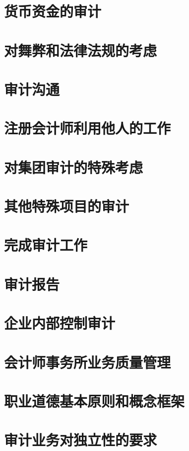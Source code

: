 \documentclass[UTF8,12pt]{ctexart}
\numberwithin{equation}{section} %
\numberwithin{figure}{section}
\numberwithin{table}{section}
\begin{document}
	\section{货币资金的审计}
	
	\newpage
	\section{对舞弊和法律法规的考虑}
	
	\newpage
	\section{审计沟通}
	
	\newpage
	\section{注册会计师利用他人的工作}
	
	\newpage
	\section{对集团审计的特殊考虑}
	
	\newpage
	\section{其他特殊项目的审计}
	
	\newpage
	\section{完成审计工作}
	
	\newpage
	\section{审计报告}
	
	\newpage
	\section{企业内部控制审计}
	
	\newpage
	\section{会计师事务所业务质量管理}
	
	\newpage
	\section{职业道德基本原则和概念框架}
	
	\newpage
	\section{审计业务对独立性的要求}
	

	

	
\end{document}
